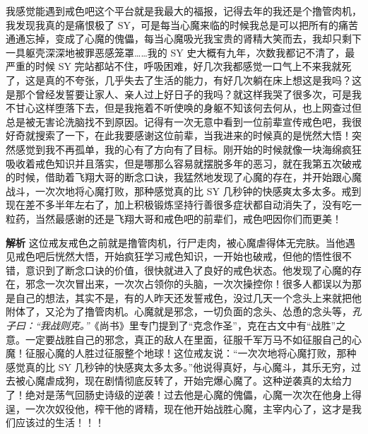 \begin{case}
    我感觉能遇到戒色吧这个平台就是我最大的福报，记得去年的我还是个撸管肉机，我发现我真的是痛恨极了 SY，可是每当心魔来临的时候我总是可以把所有的痛苦通通忘掉，变成了心魔的傀儡，每当心魔吸光我宝贵的肾精大笑而去，我却只剩下一具躯壳深深地被罪恶感笼罩……我的 SY 史大概有九年，次数我都记不清了，最严重的时候 SY 完站都站不住，呼吸困难，好几次我都感觉一口气上不来我就死了，这是真的不夸张，几乎失去了生活的能力，有好几次躺在床上想这是我吗？这是那个曾经发誓要让家人、亲人过上好日子的我吗？就这样我哭了很多次，可是我不甘心这样堕落下去，但是我拖着不听使唤的身躯不知该何去何从，也上网查过但总是被无害论洗脑找不到原因。记得有一次无意中看到一位前辈宣传戒色吧，我很好奇就搜索了一下，在此我要感谢这位前辈，当我进来的时候真的是恍然大悟！突然感觉到我不再孤单，我的心有了方向有了目标。刚开始的时候就像一块海绵疯狂吸收着戒色知识并且落实，但是哪那么容易就摆脱多年的恶习，就在我第五次破戒的时候，借助着飞翔大哥的断念口诀，我猛然地发现了心魔的存在，并开始跟心魔战斗，一次次地将心魔打败，那种感觉真的比 SY 几秒钟的快感爽太多太多。戒到现在差不多半年左右了，加上积极锻炼坚持行善很多症状都自动消失了，没有吃一粒药，当然最感谢的还是飞翔大哥和戒色吧的前辈们，戒色吧因你们而更美！

    \textbf{解析} 这位戒友戒色之前就是撸管肉机，行尸走肉，被心魔虐得体无完肤。当他遇见戒色吧后恍然大悟，开始疯狂学习戒色知识，一开始也破戒，但他的悟性很不错，意识到了断念口诀的价值，很快就进入了良好的戒色状态。他发现了心魔的存在，邪念一次次冒出来，一次次占领你的头脑，一次次操控你！很多人都误以为那是自己的想法，其实不是，有的人昨天还发誓戒色，没过几天一个念头上来就把他附体了，又沦为了撸管肉机。心魔就是邪念，一切负面的念头、怂恿的念头等，\textit{孔子曰：“我战则克。”}《尚书》里专门提到了“克念作圣”，克在古文中有“战胜”之意。一定要战胜自己的邪念，真正的敌人在里面，征服千军万马不如征服自己的心魔！征服心魔的人胜过征服整个地球！这位戒友说：“一次次地将心魔打败，那种感觉真的比 SY 几秒钟的快感爽太多太多。”他说得真好，与心魔斗，其乐无穷，过去被心魔虐成狗，现在剧情彻底反转了，开始完爆心魔了。这种逆袭真的太给力了！绝对是荡气回肠史诗级的逆袭！过去他是心魔的傀儡，心魔一次次在他身上得逞，一次次奴役他，榨干他的肾精，现在他开始战胜心魔，主宰内心了，这才是我们应该过的生活！！！
\end{case}

